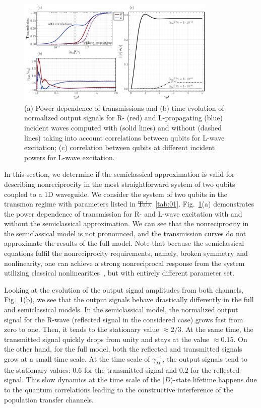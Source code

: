 \documentclass[lettersize,journal]{IEEEtran}
\providecommand{\DIFaddtex}[1]{{\protect\color{blue}\uwave{#1}}} %
\providecommand{\DIFdeltex}[1]{{\protect\color{red}\sout{#1}}}                      %
\providecommand{\DIFaddbegin}{} %
\providecommand{\DIFaddend}{} %
\providecommand{\DIFdelbegin}{} %
\providecommand{\DIFdelend}{} %
\providecommand{\DIFadd}[1]{\texorpdfstring{\DIFaddtex{#1}}{#1}} %
\providecommand{\DIFdel}[1]{\texorpdfstring{\DIFdeltex{#1}}{}} %
\newcommand{\DIFscaledelfig}{0.5}
\newlength{\DIFdelgraphicswidth} %
\newlength{\DIFdelgraphicsheight} %
\newcommand{\DIFaddincludegraphics}[2][]{{\color{blue}\fbox{\DIFOincludegraphics[#1]{#2}}}} %
\newcommand{\DIFdelincludegraphics}[2][]{%
\sbox{\DIFdelgraphicsbox}{\DIFOincludegraphics[#1]{#2}}%
\settoboxwidth{\DIFdelgraphicswidth}{\DIFdelgraphicsbox} %
\settoboxtotalheight{\DIFdelgraphicsheight}{\DIFdelgraphicsbox} %
\scalebox{\DIFscaledelfig}{%
\parbox[b]{\DIFdelgraphicswidth}{\usebox{\DIFdelgraphicsbox}\\[-\baselineskip] \rule{\DIFdelgraphicswidth}{0em}}\llap{\resizebox{\DIFdelgraphicswidth}{\DIFdelgraphicsheight}{%
\setlength{\unitlength}{\DIFdelgraphicswidth}%
\begin{picture}(1,1)%
\thicklines\linethickness{2pt} %
{\color[rgb]{1,0,0}\put(0,0){\framebox(1,1){}}}%
{\color[rgb]{1,0,0}\put(0,0){\line( 1,1){1}}}%
{\color[rgb]{1,0,0}\put(0,1){\line(1,-1){1}}}%
\end{picture}%
}\hspace*{3pt}}} %
} %
\DeclareRobustCommand{\DIFaddbegin}{\DIFOaddbegin \let\includegraphics\DIFaddincludegraphics} %
\DeclareRobustCommand{\DIFaddend}{\DIFOaddend \let\includegraphics\DIFOincludegraphics} %
\DeclareRobustCommand{\DIFdelbegin}{\DIFOdelbegin \let\includegraphics\DIFdelincludegraphics} %
\DeclareRobustCommand{\DIFdelend}{\DIFOaddend \let\includegraphics\DIFOincludegraphics} %
\begin{document}
\begin{figure}[t]
    \centering
    \includegraphics[width=0.85\textwidth]{fig_6}
    \caption{(a) Power dependence of transmissions and (b) time evolution of normalized output signals for R- (red) and L-propagating (blue) incident waves computed with (solid lines) and without (dashed lines) taking into account correlations between qubits for L-wave excitation; (c) correlation between qubits at different incident powers for L-wave excitation.}
    \label{fig:07}
\end{figure}
In this section, we determine if the semiclassical approximation is valid for describing nonreciprocity in the most straightforward system of two qubits coupled to a 1D waveguide.
We consider the system of two qubits in the transmon regime with parameters listed in \DIFdelbegin \DIFdel{Tab.}\DIFdelend \DIFaddbegin \DIFadd{Table}\DIFaddend ~\ref{tab:01}.
Fig.~\ref{fig:07}(a) demonstrates the power dependence of transmission for R- and L-wave excitation with and without the semiclassical approximation.
We can see that the nonreciprocity in the semiclassical model is not pronounced, and the transmission curves do not approximate the results of the full model.
Note that because the semiclassical equations fulfil the nonreciprocity requirements, namely, broken symmetry and nonlinearity, one can achieve a strong nonreciprocal response from the system utilizing classical nonlinearities~\cite{cotrufo2021nonlinearity1, cotrufo2021nonlinearity2, sounas_fundamental_2018, yang_inverse-designed_2020}, but with entirely different parameter set.

Looking at the evolution of the output signal amplitudes from both channels, Fig.~\ref{fig:07}(b), we see that the output signals behave drastically differently in the full and semiclassical models.
In the semiclassical model, the normalized output signal for the R-wave (reflected signal in the considered case) grows fast from zero to one. 
Then, it tends to the stationary value $\approx 2/3$.
At the same time, the transmitted signal quickly drops from unity and stays at the value $\approx 0.15$.
On the other hand, for the full model, both the reflected and transmitted signals grow at a small time scale.
At the time scale of $\gamma_D^{-1}$, the output signals tend to the stationary values: $0.6$ for the transmitted signal and $0.2$ for the reflected signal.
This slow dynamics at the time scale of the $|D\rangle$-state lifetime happens due to the quantum correlations leading to the constructive interference of the population transfer channels.
\end{document}
